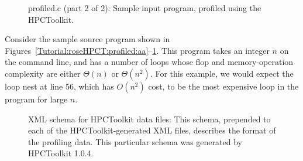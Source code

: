 \begin{figure}[!h]
{\indent
{\mySmallFontSize
\begin{latexonly}
   
\end{latexonly}

\begin{htmlonly}
   
\end{htmlonly}

}
}
\caption{profiled.c (part 2 of 2): Sample input program, profiled using the HPCToolkit.}
\label{Tutorial:roseHPCT:profiled:ab}
\end{figure}

Consider the sample source program shown in
Figures~\ref{Tutorial:roseHPCT:profiled:aa}--\ref{Tutorial:roseHPCT:profiled:ab}.
This program takes an integer $n$ on the command line, and has a
number of loops whose flop and memory-operation complexity are either
$\Theta(n)$ or $\Theta(n^2)$. For this example, we would expect the
loop nest at line 56, which has $O(n^2)$ cost, to be the most
expensive loop in the program for large $n$.

\begin{figure}[!h]
{\indent
{\mySmallFontSize
\begin{latexonly}
   
\end{latexonly}

\begin{htmlonly}
   
\end{htmlonly}

}
}
\caption{XML schema for HPCToolkit data files: This schema, prepended
to each of the HPCToolkit-generated XML files, describes the format of
the profiling data. This particular schema was generated by HPCToolkit
1.0.4.}
\label{Tutorial:roseHPCT:xml:schema}
\end{figure}

